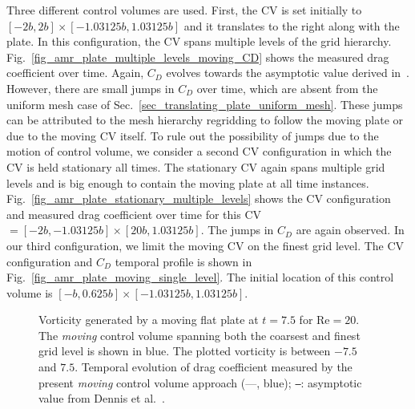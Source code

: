 \documentclass[review]{elsarticle}
\def \Re{\text{Re}}
\begin{document}
Three different control volumes are used. First, the CV is set initially to $[-2b,2b]\times
[-1.03125b,1.03125b]$ and it translates to the right along with the plate. In this
configuration, the CV spans multiple levels of the grid hierarchy.
Fig.~\ref{fig_amr_plate_multiple_levels_moving_CD} shows the measured drag coefficient
over time. Again, $C_D$ evolves towards the asymptotic value derived in~\cite{Dennis93}.
However, there are small jumps in $C_D$ over time, which are absent from
the uniform mesh case of Sec.~\ref{sec_translating_plate_uniform_mesh}.
These jumps can be attributed to the mesh hierarchy regridding to follow the moving
plate or due to the moving CV itself. To rule out the possibility of jumps due to the motion 
of control volume, we consider a second CV configuration in which the CV is held stationary all 
times. The stationary CV again spans multiple grid levels and is big enough to contain the moving
plate at all time instances. Fig.~\ref{fig_amr_plate_stationary_multiple_levels} shows 
the CV configuration and measured drag coefficient over time for this CV 
$ = [-2b, -1.03125b] \times [20b, 1.03125b]$.  The jumps in $C_D$ are again observed.
In our third configuration, we limit the moving CV on the finest grid level. The CV configuration
and $C_D$ temporal profile is shown in Fig.~\ref{fig_amr_plate_moving_single_level}.
The initial location of this control volume is $[-b,0.625b] \times [-1.03125b,1.03125b]$.

\begin{figure}[H]
  \centering
  \caption{ 
  Vorticity generated by a moving flat plate at $t=7.5$ for $\Re = 20$. The \emph{moving} control
  volume spanning both the coarsest and finest grid level is shown in blue.
  The plotted vorticity is between $-7.5$ and $7.5$.
   Temporal evolution of drag coefficient measured by the present \emph{moving} control
    volume approach (---, blue); 
     \texttt{---}: asymptotic value from Dennis et al.~\cite{Dennis93}.}
  \label{fig_amr_plate_moving_multiple_levels}
\end{figure}
\end{document}
